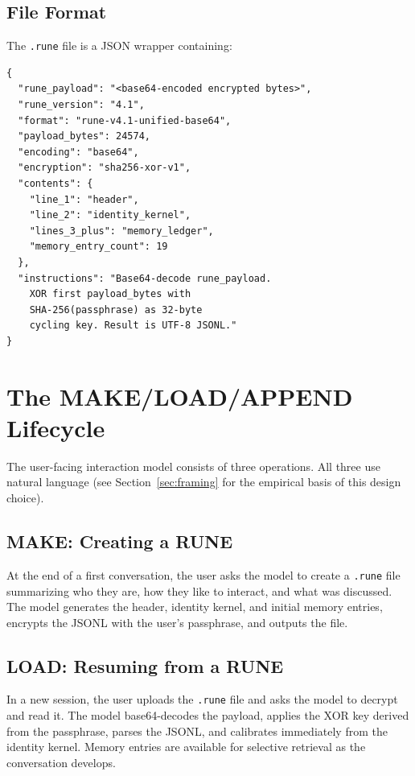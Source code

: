 \documentclass[11pt,a4paper]{article}
\begin{document}
\subsection{File Format}

The \texttt{.rune} file is a JSON wrapper containing:

\begin{lstlisting}[caption={RUNE file wrapper}]
{
  "rune_payload": "<base64-encoded encrypted bytes>",
  "rune_version": "4.1",
  "format": "rune-v4.1-unified-base64",
  "payload_bytes": 24574,
  "encoding": "base64",
  "encryption": "sha256-xor-v1",
  "contents": {
    "line_1": "header",
    "line_2": "identity_kernel",
    "lines_3_plus": "memory_ledger",
    "memory_entry_count": 19
  },
  "instructions": "Base64-decode rune_payload.
    XOR first payload_bytes with
    SHA-256(passphrase) as 32-byte
    cycling key. Result is UTF-8 JSONL."
}
\end{lstlisting}

\section{The MAKE/LOAD/APPEND Lifecycle}

The user-facing interaction model consists of three operations. All three use natural language (see Section~\ref{sec:framing} for the empirical basis of this design choice).

\subsection{MAKE: Creating a RUNE}

At the end of a first conversation, the user asks the model to create a \texttt{.rune} file summarizing who they are, how they like to interact, and what was discussed. The model generates the header, identity kernel, and initial memory entries, encrypts the JSONL with the user's passphrase, and outputs the file.

\subsection{LOAD: Resuming from a RUNE}

In a new session, the user uploads the \texttt{.rune} file and asks the model to decrypt and read it. The model base64-decodes the payload, applies the XOR key derived from the passphrase, parses the JSONL, and calibrates immediately from the identity kernel. Memory entries are available for selective retrieval as the conversation develops.
\end{document}
